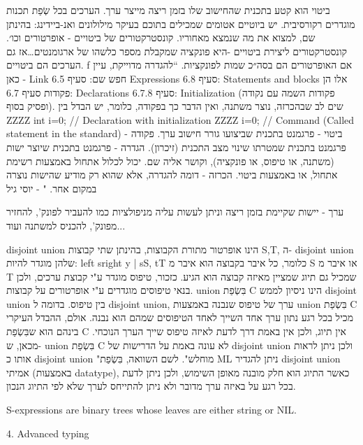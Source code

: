 \begin{טבלא}[!htbp]
        ביטוי הוא קטע בתכנית שהחישוב שלו בזמן ריצה מייצר ערך. הערכים בכל שְׂפַת תכנות מוגדרים רקורסיבית. יש ביוטיים אטומים שמכילים בתוכם בעיקר מילולונים ואנ-ביידינג: בהינתן שם, למצוא את מה שנמצא מאחוריו.
        קונסטרקטורים של ביטויים - אופרטורים וכו׳.
        קונסטרקטורים ליצירת ביטויים -היא פונקציה שמקבלת מספר כלשהו של ארגומנטים…אז גם הערכים הם ביטויים. f אם האופרטורים הם בסה״כ שמות לפונקציות.
        “להגדרה מדוייקת, עיין כאן - Link
        חפש שם: סעיף 6.5 Expressions
        סעיף 6.8: Statements and blocks אלו הן פקודות
        סעיף 6.7: Declarations
        סעיף 6.7.8: Initialization (פקודות השמה עם נקודה ופסיק בסוף).
        שים לב שבהכרזה, נוצר משתנה, ואין הדבר כך בפקודה, כלומר, יש הבדל בין
        ZZZZ int i=0; // Declaration with initialization
        ZZZZ i=0; // Command (Called statement in the standard)
        ביטוי - פרגמנט בתכנית שביצועו גורר חישוב ערך.
        פקודה - פרגמנט בתכנית שמטרתו שינוי מצב התכנית (זיכרון).
        הגדרה - פרגמנט בתכנית שיוצר ישות (משתנה, או טיפוס, או פונקציה), וקושר אליה שם. יכול לכלול אתחול באמצעות רשימת אתחול, או באמצעות ביטוי.
        הכרזה - דומה להגדרה, אלא שהוא רק מודיע שהישות נוצרה במקום אחר. "
        - יוסי גיל

        ערך - יישות שקיימת בזמן ריצה וניתן לעשות עליה מניפולציות כמו להעביר לפונק', להחזיר מפונק', להכניס למשתנה ועוד...

        disjoint union הינו אופרטור מתורת הקבוצות, בהינתן שתי קבוצות S,T, ה- disjoint union שלהן מוגדר להיות:
        {left sright y | sS, tT}
        כלומר, כל איבר בקבוצה הוא איבר מ S או איבר מ T שמכיל גם תיוג שמציין מאיזה קבוצה הוא הגיע.
        כזכור, טיפוס מוגדר ע"י קבוצת ערכים, ולכן בנאי טיפוסים מוגדרים ע"י אופרטורים על קבוצות.
        union בִּשְׂפַת C הינו ניסיון לממש disjoint union בין טיפוס.
        בדומה ל disjoint union, ערך של טיפוס שנבנה באמצעות union בִּשְׂפַת C מכיל בכל רגע נתון ערך אחד השייך לאחד הטיפוסים שמהם הוא נבנה.
        אולם, ההבדל העיקרי בינהם הוא שבִּשְׂפַת C אין תיוג, ולכן אין באמת דרך לדעת לאיזה טיפוס שייך הערך הנוכחי.
        מכאן, ש- union בִּשְׂפַת C לא עונה באמת על הדרישות של disjoint union ולכן ניתן לראות אותו כ disjoint union "מוחלש".
        לשם השוואה, בִּשְׂפַת ML ניתן להגדיר disjoint union אמיתי (באמצעות datatype), כאשר התיוג הוא חלק מובנה מאופן השימוש, ולכן ניתן לדעת בכל רגע על באיזה ערך מדובר ולא ניתן להתייחס לערך שלא לפי התיוג הנכון.

        S-expressions are binary trees whose leaves are either string or NIL.

        4. Advanced typing


\end{טבלא}
